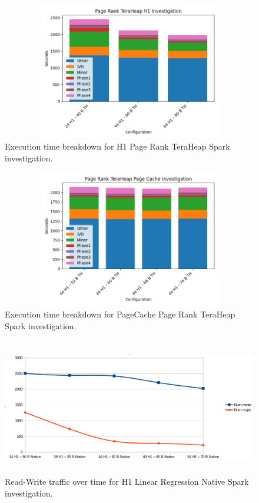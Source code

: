\begin{figure}[ht!]
    \includegraphics[width=12cm,height=6cm]{./fig/pr_h1_th.png}
    \caption{Execution time breakdown for H1 Page Rank TeraHeap Spark
    investigation.} 
    \label{fig:pr_h1_th}
\end{figure}

\begin{figure}[ht!]
    \includegraphics[width=12cm,height=6cm]{./fig/pr_pc_th.png}
    \caption{Execution time breakdown for PageCache Page Rank TeraHeap
    Spark investigation.}
    \label{fig:pr_pc_th}
\end{figure}

\begin{figure}[ht!]
    \includegraphics[width=12cm,height=6cm]{./fig/rw_linr_h1_native.png}
    \caption{Read-Write traffic over time for H1 Linear Regression
    Native Spark investigation.}
    \label{fig:rw_linr_h1_native}
\end{figure}

